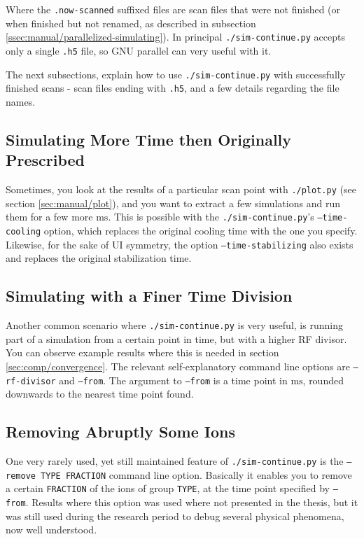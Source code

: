 Where the \texttt{.now-scanned} suffixed files are scan files that were not finished (or when finished but not renamed, as described in subsection \ref{ssec:manual/parallelized-simulating}). In principal \texttt{./sim-continue.py} accepts only a single \texttt{.h5} file, so GNU parallel\cite{GNUParallel} can very useful with it.

The next subsections, explain how to use \texttt{./sim-continue.py} with successfully finished scans - scan files ending with \texttt{.h5}, and a few details regarding the file names.

\subsection{Simulating More Time then Originally Prescribed}

Sometimes, you look at the results of a particular scan point with \texttt{./plot.py} (see section \ref{sec:manual/plot}), and you want to extract a few simulations and run them for a few more $\mathrm{ms}$. This is possible with the \texttt{./sim-continue.py}'s \texttt{--time-cooling} option, which replaces the original cooling time with the one you specify. Likewise, for the sake of UI symmetry, the option \texttt{--time-stabilizing} also exists and replaces the original stabilization time.

\subsection{Simulating with a Finer Time Division}

Another common scenario where \texttt{./sim-continue.py} is very useful, is running part of a simulation from a certain point in time, but with a higher RF divisor. You can observe example results where this is needed in section \ref{sec:comp/convergence}. The relevant self-explanatory command line options are \texttt{--rf-divisor} and \texttt{--from}. The argument to \texttt{--from} is a time point in $\mathrm{ms}$, rounded downwards to the nearest time point found.

\subsection{Removing Abruptly Some Ions}

One very rarely used, yet still maintained feature of \texttt{./sim-continue.py} is the \texttt{--remove TYPE FRACTION} command line option. Basically it enables you to remove a certain \texttt{FRACTION} of the ions of group \texttt{TYPE}, at the time point specified by \texttt{--from}. Results where this option was used where not presented in the thesis, but it was still used during the research period to debug several physical phenomena, now well understood.

